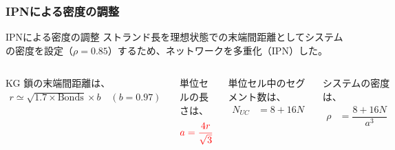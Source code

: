 \documentclass[11pt, dvipdfmx]{beamer}
\begin{document}
\begin{frame}
\frametitle{IPNによる密度の調整}

\begin{alertblock}{IPNによる密度の調整}
ストランド長を理想状態での末端間距離としてシステムの密度を設定（$\rho = 0.85$）するため、ネットワークを多重化（IPN）した。
\end{alertblock}

\begin{columns}[totalwidth=1\textwidth]

\footnotesize
KG 鎖の末端間距離は、
\vspace{-3mm}
\begin{align*}
r \simeq \sqrt{1.7 \times \text{Bonds}}\times b \quad(b=0.97)
\end{align*}

\vspace{-3mm}
単位セルの長さは、
\vspace{-3mm}
\footnotesize
\begin{align*}
\color{red}
a= \dfrac{4 r}{\sqrt{3}}
\end{align*}


\footnotesize
単位セル中のセグメント数は、
\vspace{-3mm}
\begin{align*}
N_{UC}&= 8+16N
\end{align*}

\vspace{-3mm}
システムの密度は、
\vspace{-3mm}
\begin{align*}
\rho&=\dfrac{8+16N}{a^3}
\end{align*}
\end{columns}


\end{frame}
\end{document}
